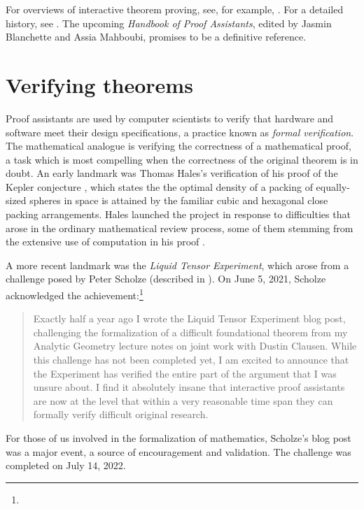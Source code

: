 \documentclass[12pt]{amsart}
\theoremstyle{definition}
\theoremstyle{remark}
\numberwithin{equation}{section}
\begin{document}
For overviews of interactive theorem proving, see, for example, \cite{avigad:harrison:14,buzzard:20,hales:15}. For a detailed history, see \cite{harrison:urban:wiedijk:14}. The upcoming \emph{Handbook of Proof Assistants}, edited by Jasmin Blanchette and Assia Mahboubi, promises to be a definitive reference.


\section{Verifying theorems}

Proof assistants are used by computer scientists to verify that hardware and software meet their design specifications, a practice known as \emph{formal verification}. The mathematical analogue is verifying the correctness of a mathematical proof, a task which is most compelling when the correctness of the original theorem is in doubt. An early landmark was Thomas Hales's verification of his proof of the Kepler conjecture \cite{hales:05}, which states the the optimal density of a packing of equally-sized spheres in space is attained by the familiar cubic and hexagonal close packing arrangements. Hales launched the project in response to difficulties that arose in the ordinary mathematical review process, some of them stemming from the extensive use of computation in his proof \cite{hales:et:al:17}.

A more recent landmark was the \emph{Liquid Tensor Experiment}, which arose from a challenge posed by Peter Scholze (described in \cite{castelvecchi:21}).
On June 5, 2021, Scholze acknowledged the achievement:\footnote{}
\begin{quote}
Exactly half a year ago I wrote the Liquid Tensor Experiment blog post, challenging the formalization of a difficult foundational theorem from my Analytic Geometry lecture notes on joint work with Dustin Clausen. While this challenge has not been completed yet, I am excited to announce that the Experiment has verified the entire part of the argument that I was unsure about. I find it absolutely insane that interactive proof assistants are now at the level that within a very reasonable time span they can formally verify difficult original research.
\end{quote}
For those of us involved in the formalization of mathematics, Scholze's blog post was a major event, a source of encouragement and validation. The challenge was completed on July 14, 2022.
\end{document}
